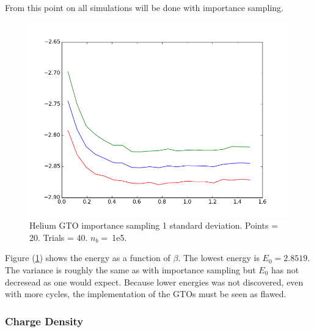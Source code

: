 \documentclass[twocolumn,fleqn,8pt]{article}  %
\begin{document}
From this point on all simulations will be done with importance sampling. \\


\begin{figure}
	\includegraphics[width=\columnwidth]{../res/plot/helium_05/helium_05.png}
	\caption{Helium GTO importance sampling 1 standard deviation. 
	Points = 20. Trials = 40.	$n_b = \:$1e5.}
	\label{fig:helium_05}
\end{figure}
Figure (\ref{fig:helium_05}) shows the energy as a function of $\beta$. 
The lowest energy is $E_0 = 2.8519$. 
The variance is
roughly the same as with importance sampling
but $E_0$ has not decresead as one would expect. Because lower energies was
not discovered, even with more cycles, the implementation of the GTOs must be seen as flawed.

\subsubsection*{Charge Density}
\end{document}
